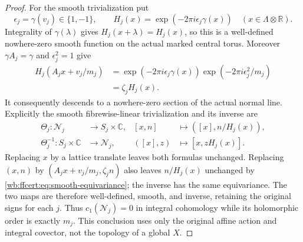 \begin{proof}
For the smooth trivialization put
\[
 \epsilon_j=\gamma(v_j)\in\{1,-1\},\qquad
 H_j(x)=\exp(-2\pi i\epsilon_j\gamma(x))
 \quad(x\in\Lambda\otimes\mathbb R).
 \tag{FF44}\label{wb:ffcert:eq:smooth-normal-section}
\]
Integrality of $\gamma(\lambda)$ gives $H_j(x+\lambda)=H_j(x)$,
so this is a well-defined nowhere-zero smooth function on the actual
marked central torus. Moreover $\gamma A_j=\gamma$ and
$\epsilon_j^2=1$ give
\[
 \begin{aligned}
 H_j(A_jx+v_j/m_j)
 &=\exp(-2\pi i\epsilon_j\gamma(x))
       \exp(-2\pi i\epsilon_j^2/m_j)\\
 &=\zeta_jH_j(x).
 \end{aligned}
 \tag{FF45}\label{wb:ffcert:eq:smooth-equivariance}
\]
It consequently descends to a nowhere-zero section of the actual
normal line. Explicitly the smooth fibrewise-linear trivialization and
its inverse are
\[
 \begin{aligned}
 \Theta_j:\mathcal N_j&\longrightarrow S_j\times\mathbb C,
 & [x,n]&\longmapsto([x],n/H_j(x)),\\
 \Theta_j^{-1}:S_j\times\mathbb C&\longrightarrow\mathcal N_j,
 & ([x],z)&\longmapsto[x,zH_j(x)].
 \end{aligned}
 \tag{FF46}\label{wb:ffcert:eq:normal-product-isomorphism}
\]
Replacing $x$ by a lattice translate leaves both formulas unchanged.
Replacing $(x,n)$ by
$(A_jx+v_j/m_j,\zeta_jn)$ also leaves $n/H_j(x)$ unchanged by
\eqref{wb:ffcert:eq:smooth-equivariance}; the inverse has the same
equivariance. The two maps are therefore well-defined, smooth, and
inverse, retaining the original signs for each $j$. Thus
$c_1(\mathcal N_j)=0$ in integral cohomology while its holomorphic
order is exactly $m_j$. This conclusion uses only the original affine
action and integral covector, not the topology of a global $X$.
\end{proof}
